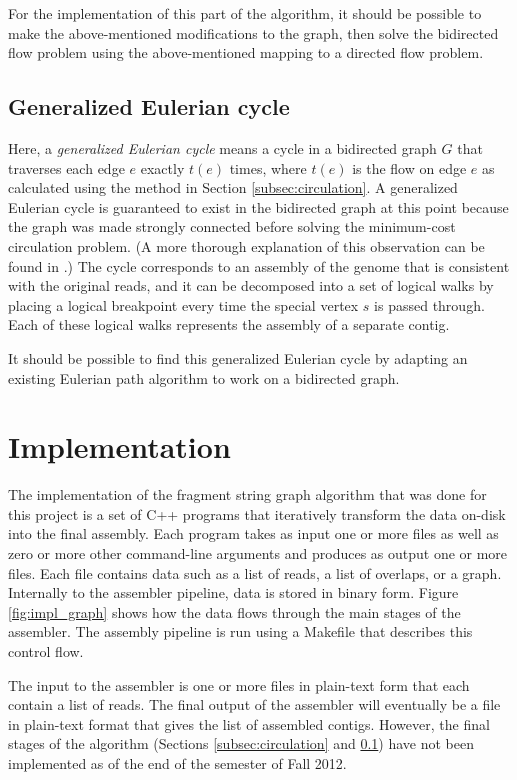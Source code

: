 \documentclass[12pt]{article}
\newcommand{\Figure}[1]{Figure \ref{#1}}
\newcommand{\Subsection}[1]{Section \ref{#1}}
\newcommand{\KeyTerm}[1]{{\it #1}}
\begin{document}
For the implementation of this part of the algorithm, it should be possible to
make the above-mentioned modifications to the graph, then solve the bidirected
flow problem using the above-mentioned mapping to a directed flow problem.

\subsection{Generalized Eulerian cycle}

\label{subsec:eulerian}

Here, a \KeyTerm{generalized Eulerian cycle} means a cycle in a bidirected graph
$G$ that traverses each edge $e$ exactly $t(e)$ times, where $t(e)$ is the flow
on edge $e$ as calculated using the method in \Subsection{subsec:circulation}.
A generalized Eulerian cycle is guaranteed to exist in the bidirected graph at
this point because the graph was made strongly connected before solving the
minimum-cost circulation problem.  (A more thorough explanation of this
observation can be found in \cite{Medvedev2009}.)  The cycle corresponds to an
assembly of the genome that is consistent with the original reads, and it can be
decomposed into a set of logical walks by placing a logical breakpoint every
time the special vertex $s$ is passed through.  Each of these logical walks
represents the assembly of a separate contig.

It should be possible to find this generalized Eulerian cycle by adapting an
existing Eulerian path algorithm to work on a bidirected graph.

\section{Implementation}

The implementation of the fragment string graph algorithm that was done for this
project is a set of C++ programs that iteratively transform the data on-disk
into the final assembly.  Each program takes as input one or more files as well
as zero or more other command-line arguments and produces as output one or more
files.  Each file contains data such as a list of reads, a list of overlaps, or
a graph.  Internally to the assembler pipeline, data is stored in binary form.
\Figure{fig:impl_graph} shows how the data flows through the main stages of the
assembler.  The assembly pipeline is run using a Makefile that describes this
control flow.

The input to the assembler is one or more files in plain-text form that each
contain a list of reads.  The final output of the assembler will eventually be a
file in plain-text format that gives the list of assembled contigs.  However,
the final stages of the algorithm (Sections \ref{subsec:circulation} and
\ref{subsec:eulerian}) have not been implemented as of the end of the semester
of Fall 2012.
\end{document}
